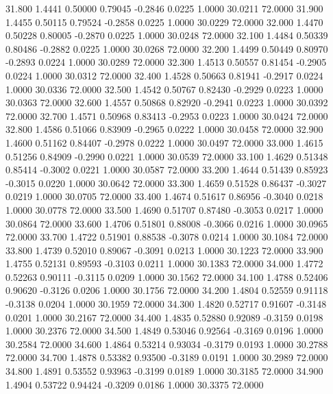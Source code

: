   31.800   1.4441   0.50000   0.79045  -0.2846   0.0225   1.0000  30.0211  72.0000
  31.900   1.4455   0.50115   0.79524  -0.2858   0.0225   1.0000  30.0229  72.0000
  32.000   1.4470   0.50228   0.80005  -0.2870   0.0225   1.0000  30.0248  72.0000
  32.100   1.4484   0.50339   0.80486  -0.2882   0.0225   1.0000  30.0268  72.0000
  32.200   1.4499   0.50449   0.80970  -0.2893   0.0224   1.0000  30.0289  72.0000
  32.300   1.4513   0.50557   0.81454  -0.2905   0.0224   1.0000  30.0312  72.0000
  32.400   1.4528   0.50663   0.81941  -0.2917   0.0224   1.0000  30.0336  72.0000
  32.500   1.4542   0.50767   0.82430  -0.2929   0.0223   1.0000  30.0363  72.0000
  32.600   1.4557   0.50868   0.82920  -0.2941   0.0223   1.0000  30.0392  72.0000
  32.700   1.4571   0.50968   0.83413  -0.2953   0.0223   1.0000  30.0424  72.0000
  32.800   1.4586   0.51066   0.83909  -0.2965   0.0222   1.0000  30.0458  72.0000
  32.900   1.4600   0.51162   0.84407  -0.2978   0.0222   1.0000  30.0497  72.0000
  33.000   1.4615   0.51256   0.84909  -0.2990   0.0221   1.0000  30.0539  72.0000
  33.100   1.4629   0.51348   0.85414  -0.3002   0.0221   1.0000  30.0587  72.0000
  33.200   1.4644   0.51439   0.85923  -0.3015   0.0220   1.0000  30.0642  72.0000
  33.300   1.4659   0.51528   0.86437  -0.3027   0.0219   1.0000  30.0705  72.0000
  33.400   1.4674   0.51617   0.86956  -0.3040   0.0218   1.0000  30.0778  72.0000
  33.500   1.4690   0.51707   0.87480  -0.3053   0.0217   1.0000  30.0864  72.0000
  33.600   1.4706   0.51801   0.88008  -0.3066   0.0216   1.0000  30.0965  72.0000
  33.700   1.4722   0.51901   0.88538  -0.3078   0.0214   1.0000  30.1084  72.0000
  33.800   1.4739   0.52010   0.89067  -0.3091   0.0213   1.0000  30.1223  72.0000
  33.900   1.4755   0.52131   0.89593  -0.3103   0.0211   1.0000  30.1383  72.0000
  34.000   1.4772   0.52263   0.90111  -0.3115   0.0209   1.0000  30.1562  72.0000
  34.100   1.4788   0.52406   0.90620  -0.3126   0.0206   1.0000  30.1756  72.0000
  34.200   1.4804   0.52559   0.91118  -0.3138   0.0204   1.0000  30.1959  72.0000
  34.300   1.4820   0.52717   0.91607  -0.3148   0.0201   1.0000  30.2167  72.0000
  34.400   1.4835   0.52880   0.92089  -0.3159   0.0198   1.0000  30.2376  72.0000
  34.500   1.4849   0.53046   0.92564  -0.3169   0.0196   1.0000  30.2584  72.0000
  34.600   1.4864   0.53214   0.93034  -0.3179   0.0193   1.0000  30.2788  72.0000
  34.700   1.4878   0.53382   0.93500  -0.3189   0.0191   1.0000  30.2989  72.0000
  34.800   1.4891   0.53552   0.93963  -0.3199   0.0189   1.0000  30.3185  72.0000
  34.900   1.4904   0.53722   0.94424  -0.3209   0.0186   1.0000  30.3375  72.0000
